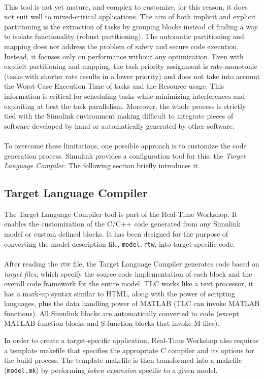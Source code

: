 \paragraph{} This tool is not yet mature, and complex to customize, for this reason, it does not suit well to mixed-critical applications. The aim of both implicit and explicit partitioning is the extraction of tasks by grouping blocks instead of finding a way to isolate functionality (robust partitioning). The automatic partitioning and mapping does not address the problem of safety and secure code execution. Instead, it focuses only on performance without any optimization. Even with explicit partitioning and mapping, the task priority assignment is rate-monotonic (tasks with shorter rate results in a lower priority) and does not take into account the Worst-Case Execution Time of tasks and the Resource usage. This information is critical for scheduling tasks while minimizing interferences and exploiting at best the task parallelism. Moreover, the whole process is strictly tied with the Simulink environment making difficult to integrate pieces of software developed by hand or automatically generated by other software.

\paragraph{} To overcome these limitations, one possible approach is to customize the code generation process. Simulink provides a configuration tool for this: the \emph{Target Language Compiler}. The following section briefly introduces it.

\subsection{Target Language Compiler}
The Target Language Compiler tool is part of the Real-Time Workshop. It enables the customization of the C/C++ code generated from any Simulink model or custom defined blocks. It has been designed for the purpose of converting the model description file, \verb|model.rtw|, into target-specific code.

\paragraph{} After reading the rtw file, the Target Language Compiler generates code based on \emph{target files}, which specify the source code implementation of each block and the overall code framework for the entire model. TLC works like a text processor, it has a mark-up syntax similar to HTML, along with the power of scripting languages, plus the data handling power of MATLAB (TLC can invoke MATLAB functions). All Simulink blocks are automatically converted to code (except MATLAB function blocks and S-function blocks that invoke M-files). 
\par In order to create a target-specific application, Real-Time Workshop also requires a template makefile that specifies the appropriate C compiler and its options for the build process. The template makefile is then transformed into a makefile (\verb|model.mk|) by performing \emph{token expansion} specific to a given model.

